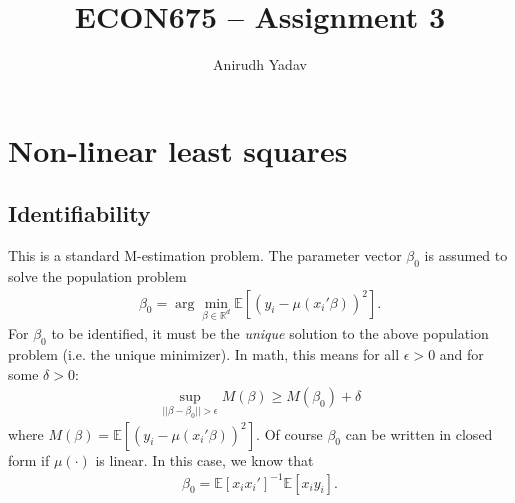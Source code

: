 \documentclass[12pt]{article}
\title{ECON675 -- Assignment 3}
\author{Anirudh Yadav}
\newcommand{\R}{\mathbb{R}}
\newcommand{\E}{\mathbb{E}}
\newcommand{\e}{\epsilon}
\newcommand{\mtx}[1]{\ensuremath{\bm{\mathit{#1}}}}
\begin{document}
\maketitle

\setcounter{tocdepth}{2}
\tableofcontents

\newpage

\section{Non-linear least squares}

\subsection{Identifiability}
This is a standard M-estimation problem. The parameter vector $\mtx{\beta}_0$ is assumed to solve the population problem
\begin{align*}
\mtx{\beta}_0 = \arg \min_{\beta \in \R^d} \E[(y_i - \mu(\mtx{x}_i'\mtx{\beta}))^2].
\end{align*}
For $\mtx{\beta}_0$ to be identified, it must be the \textit{unique} solution to the above population problem (i.e. the unique minimizer). In math, this means for all $\e>0$ and for some $\delta >0$:
\begin{align*}
\sup_{|| \beta - \beta_0 || > \e} M(\mtx{\beta}) \geq M(\mtx{\beta}_0) + \delta
\end{align*}
where $M(\mtx{\beta}) = \E[(y_i - \mu(\mtx{x}_i'\mtx{\beta}))^2]$. Of course $\mtx{\beta}_0$ can be written in closed form if $\mu(\cdot)$ is linear. In this case, we know that 
\begin{align*}
\mtx{\beta}_0= \E[\mtx{x}_i\mtx{x}_i']^{-1}\E[\mtx{x}_iy_i].
\end{align*}
\end{document}
